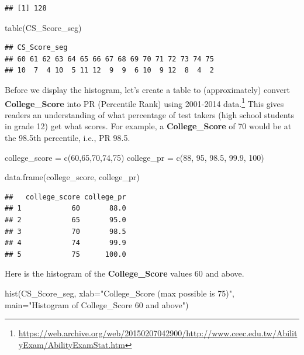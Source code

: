 \documentclass[
]{article}
\newenvironment{Shaded}{\begin{snugshade}}{\end{snugshade}}
\newcommand{\AttributeTok}[1]{\textcolor[rgb]{0.77,0.63,0.00}{#1}}
\newcommand{\DecValTok}[1]{\textcolor[rgb]{0.00,0.00,0.81}{#1}}
\newcommand{\FloatTok}[1]{\textcolor[rgb]{0.00,0.00,0.81}{#1}}
\newcommand{\FunctionTok}[1]{\textcolor[rgb]{0.00,0.00,0.00}{#1}}
\newcommand{\NormalTok}[1]{#1}
\newcommand{\OtherTok}[1]{\textcolor[rgb]{0.56,0.35,0.01}{#1}}
\newcommand{\StringTok}[1]{\textcolor[rgb]{0.31,0.60,0.02}{#1}}
\begin{document}
\begin{verbatim}
## [1] 128
\end{verbatim}

\begin{Shaded}
\begin{Highlighting}[]
\FunctionTok{table}\NormalTok{(CS\_Score\_seg)}
\end{Highlighting}
\end{Shaded}

\begin{verbatim}
## CS_Score_seg
## 60 61 62 63 64 65 66 67 68 69 70 71 72 73 74 75 
## 10  7  4 10  5 11 12  9  9  6 10  9 12  8  4  2
\end{verbatim}

Before we display the histogram, let's create a table to (approximately)
convert \textbf{College\_Score} into PR (Percentile Rank) using
2001-2014 data.\footnote{\url{https://web.archive.org/web/20150207042900/http://www.ceec.edu.tw/AbilityExam/AbilityExamStat.htm}}
This gives readers an understanding of what percentage of test takers
(high school students in grade 12) get what scores. For example, a
\textbf{College\_Score} of 70 would be at the 98.5th percentile, i.e.,
PR 98.5.

\begin{Shaded}
\begin{Highlighting}[]
\NormalTok{college\_score }\OtherTok{=} \FunctionTok{c}\NormalTok{(}\DecValTok{60}\NormalTok{,}\DecValTok{65}\NormalTok{,}\DecValTok{70}\NormalTok{,}\DecValTok{74}\NormalTok{,}\DecValTok{75}\NormalTok{)}
\NormalTok{college\_pr }\OtherTok{=} \FunctionTok{c}\NormalTok{(}\DecValTok{88}\NormalTok{, }\DecValTok{95}\NormalTok{, }\FloatTok{98.5}\NormalTok{, }\FloatTok{99.9}\NormalTok{, }\DecValTok{100}\NormalTok{)}

\FunctionTok{data.frame}\NormalTok{(college\_score, college\_pr)}
\end{Highlighting}
\end{Shaded}

\begin{verbatim}
##   college_score college_pr
## 1            60       88.0
## 2            65       95.0
## 3            70       98.5
## 4            74       99.9
## 5            75      100.0
\end{verbatim}

Here is the histogram of the \textbf{College\_Score} values 60 and
above.

\begin{Shaded}
\begin{Highlighting}[]
\FunctionTok{hist}\NormalTok{(CS\_Score\_seg, }\AttributeTok{xlab=}\StringTok{"College\_Score (max possible is 75)"}\NormalTok{,}
     \AttributeTok{main=}\StringTok{"Histogram of College\_Score 60 and above"}\NormalTok{)}
\end{Highlighting}
\end{Shaded}
\end{document}
